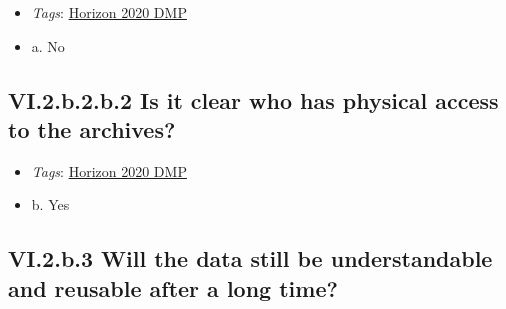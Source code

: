 \documentclass[a4paper,12pt]{report}
\begin{document}
\begin{itemize}
  \item \textit{Tags}: \ul{Horizon 2020 DMP}
  \end{itemize}




\begin{itemize}
  \item[\CheckmarkBold] a. No
\end{itemize}




\subsection*{\protect\textcolor{colorSecId}{VI.2.b.2.b.2} Is it clear who has physical access to the archives?}

\label{d5b27482-b598-4b8c-b534-417d4ad27394.d5784d24-0e66-4821-bd62-a711fb6d7a40.e81599af-4519-4987-b74e-9545428ed0e3.ed3d43ad-d2b5-4194-8b05-08c95da0a7f2.29498f8c-ea29-4855-82db-5b1228dc09ba.7458c3bc-60aa-44ba-8d59-a0672dc8de63}


\begin{itemize}
  \item \textit{Tags}: \ul{Horizon 2020 DMP}
  \end{itemize}




\begin{itemize}
  \item[\CheckmarkBold] b. Yes
\end{itemize}




\subsection*{\protect\textcolor{colorSecId}{VI.2.b.3} Will the data still be understandable and reusable after a long time?}

\label{d5b27482-b598-4b8c-b534-417d4ad27394.d5784d24-0e66-4821-bd62-a711fb6d7a40.e81599af-4519-4987-b74e-9545428ed0e3.e23201aa-df56-4ade-9406-baa1fb6b1c0c}
\end{document}
